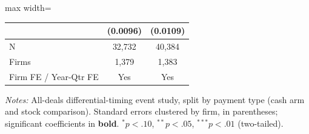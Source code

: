 \begin{table}[htbp]
\begin{adjustbox}{max width=\linewidth}
\begin{tabular}{lcc}
 & (0.0096) & (0.0109)  \\
\midrule
N & 32,732 & 40,384  \\
Firms & 1,379 & 1,383  \\
\midrule
Firm FE / Year-Qtr FE & Yes & Yes \\
\bottomrule\end{tabular}\end{adjustbox}
\begin{minipage}{\linewidth}\vspace{2pt}\scriptsize\textit{Notes:} All-deals differential-timing event study, split by payment type (cash arm and stock comparison). Standard errors clustered by firm, in parentheses; significant coefficients in \textbf{bold}. $^{*}p<.10$, $^{**}p<.05$, $^{***}p<.01$ (two-tailed).\end{minipage}\end{table}

\clearpage

